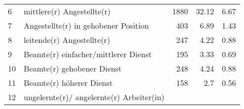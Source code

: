 \begin{longtable}{lXrrr}
     6 &
     \multicolumn{1}{X}{ mittlere(r) Angestellte(r)   } &


       \num{1880} &
       \num[round-mode=places,round-precision=2]{32,12} &
         \num[round-mode=places,round-precision=2]{6,67} \\

     7 &
     \multicolumn{1}{X}{ Angestellte(r) in gehobener Position   } &


       \num{403} &
       \num[round-mode=places,round-precision=2]{6,89} &
         \num[round-mode=places,round-precision=2]{1,43} \\

     8 &
     \multicolumn{1}{X}{ leitende(r) Angestellte(r)   } &


       \num{247} &
       \num[round-mode=places,round-precision=2]{4,22} &
         \num[round-mode=places,round-precision=2]{0,88} \\

     9 &
     \multicolumn{1}{X}{ Beamte(r) einfacher/mittlerer Dienst   } &


       \num{195} &
       \num[round-mode=places,round-precision=2]{3,33} &
         \num[round-mode=places,round-precision=2]{0,69} \\

     10 &
     \multicolumn{1}{X}{ Beamte(r) gehobener Dienst   } &


       \num{248} &
       \num[round-mode=places,round-precision=2]{4,24} &
         \num[round-mode=places,round-precision=2]{0,88} \\

     11 &
     \multicolumn{1}{X}{ Beamte(r) höherer Dienst   } &


       \num{158} &
       \num[round-mode=places,round-precision=2]{2,7} &
         \num[round-mode=places,round-precision=2]{0,56} \\

     12 &
     \multicolumn{1}{X}{ ungelernte(r)/ angelernte(r) Arbeiter(in)   } &



\end{longtable}
